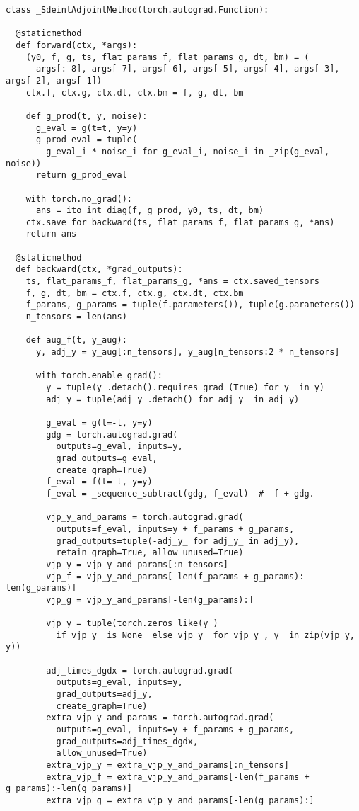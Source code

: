 \documentclass[twoside]{article}
\begin{document}
\begin{verbatim}
class _SdeintAdjointMethod(torch.autograd.Function):

  @staticmethod
  def forward(ctx, *args):
    (y0, f, g, ts, flat_params_f, flat_params_g, dt, bm) = (
      args[:-8], args[-7], args[-6], args[-5], args[-4], args[-3], args[-2], args[-1])
    ctx.f, ctx.g, ctx.dt, ctx.bm = f, g, dt, bm

    def g_prod(t, y, noise):
      g_eval = g(t=t, y=y)
      g_prod_eval = tuple(
        g_eval_i * noise_i for g_eval_i, noise_i in _zip(g_eval, noise))
      return g_prod_eval

    with torch.no_grad():
      ans = ito_int_diag(f, g_prod, y0, ts, dt, bm)
    ctx.save_for_backward(ts, flat_params_f, flat_params_g, *ans)
    return ans

  @staticmethod
  def backward(ctx, *grad_outputs):
    ts, flat_params_f, flat_params_g, *ans = ctx.saved_tensors
    f, g, dt, bm = ctx.f, ctx.g, ctx.dt, ctx.bm
    f_params, g_params = tuple(f.parameters()), tuple(g.parameters())
    n_tensors = len(ans)

    def aug_f(t, y_aug):
      y, adj_y = y_aug[:n_tensors], y_aug[n_tensors:2 * n_tensors]

      with torch.enable_grad():
        y = tuple(y_.detach().requires_grad_(True) for y_ in y)
        adj_y = tuple(adj_y_.detach() for adj_y_ in adj_y)

        g_eval = g(t=-t, y=y)
        gdg = torch.autograd.grad(
          outputs=g_eval, inputs=y,
          grad_outputs=g_eval,
          create_graph=True)
        f_eval = f(t=-t, y=y)
        f_eval = _sequence_subtract(gdg, f_eval)  # -f + gdg.

        vjp_y_and_params = torch.autograd.grad(
          outputs=f_eval, inputs=y + f_params + g_params,
          grad_outputs=tuple(-adj_y_ for adj_y_ in adj_y),
          retain_graph=True, allow_unused=True)
        vjp_y = vjp_y_and_params[:n_tensors]
        vjp_f = vjp_y_and_params[-len(f_params + g_params):-len(g_params)]
        vjp_g = vjp_y_and_params[-len(g_params):]

        vjp_y = tuple(torch.zeros_like(y_) 
          if vjp_y_ is None  else vjp_y_ for vjp_y_, y_ in zip(vjp_y, y))

        adj_times_dgdx = torch.autograd.grad(
          outputs=g_eval, inputs=y,
          grad_outputs=adj_y,
          create_graph=True)
        extra_vjp_y_and_params = torch.autograd.grad(
          outputs=g_eval, inputs=y + f_params + g_params,
          grad_outputs=adj_times_dgdx,
          allow_unused=True)
        extra_vjp_y = extra_vjp_y_and_params[:n_tensors]
        extra_vjp_f = extra_vjp_y_and_params[-len(f_params + g_params):-len(g_params)]
        extra_vjp_g = extra_vjp_y_and_params[-len(g_params):]


\end{verbatim}
\end{document}
